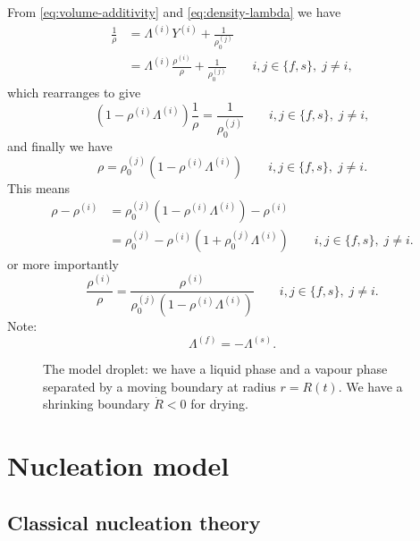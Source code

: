 \documentclass[11pt,twoside]{report}
\begin{document}
From \eqref{eq:volume-additivity} and \eqref{eq:density-lambda} we have
\begin{equation*}
  \begin{aligned}
    \frac{1}{\rho} &=
    \Lambda^{(i)} Y^{(i)} + \frac{1}{\rho^{(j)}_0} \\
    &=
    \Lambda^{(i)} \frac{\rho^{(i)}}{\rho} + \frac{1}{\rho^{(j)}_0}
    \qquad i,j \in \{f,s\}, \; j \ne i,
  \end{aligned}
\end{equation*}
which rearranges to give
\begin{equation*}
  (1 - \rho^{(i)} \Lambda^{(i)})
  \frac{1}{\rho} =
  \frac{1}{\rho^{(j)}_0}
  \qquad i,j \in \{f,s\}, \; j \ne i,
\end{equation*}
and finally we have
\begin{equation}
  \rho =
  \rho^{(j)}_0 (1 - \rho^{(i)} \Lambda^{(i)})
  \qquad i,j \in \{f,s\}, \; j \ne i.
\end{equation}
This means
\begin{equation}
  \begin{aligned}
    \rho - \rho^{(i)} &=
    \rho^{(j)}_0 (1 - \rho^{(i)} \Lambda^{(i)}) - \rho^{(i)} \\
    &=
    \rho^{(j)}_0 - \rho^{(i)}(1 + \rho^{(j)}_0 \Lambda^{(i)})
    \qquad i,j \in \{f,s\}, \; j \ne i.
  \end{aligned}
\end{equation}
or more importantly
\begin{equation}
  \frac{\rho^{(i)}}{\rho} =
  \frac{\rho^{(i)}}{\rho^{(j)}_0 (1 - \rho^{(i)} \Lambda^{(i)})}
  \qquad i,j \in \{f,s\}, \; j \ne i.
\end{equation}
Note:
\begin{equation*}
  \Lambda^{(f)} = -\Lambda^{(s)}.
\end{equation*}

\begin{figure}
  \missingfigure[figwidth=\linewidth]{}
  \caption{The model droplet: we have a liquid phase and a vapour phase separated by a moving boundary at radius $r=R(t)$.
  We have a shrinking boundary $\dot{R} < 0$ for drying.}
\end{figure}

\section{Nucleation model}
\subsection{Classical nucleation theory}
\label{sec:classical-nucleation-theory}
\end{document}
